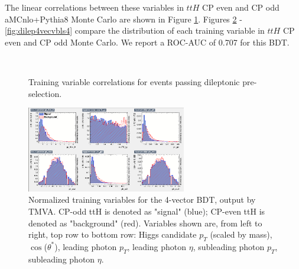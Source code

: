 The linear correlations between these variables in $ttH$ CP even and CP odd aMCnlo+Pythia8 Monte Carlo are shown in Figure \ref{fig:dilepcorr4vec}.  Figures \ref{fig:dilep4vecvbls1} - \ref{fig:dilep4vecvbls4} compare the distribution of each training variable in $ttH$ CP even and CP odd Monte Carlo. We report a ROC-AUC of 0.707 for this BDT.

\begin{figure}[htbp]
  \centering
    \\
 \caption{Training variable correlations for events passing dileptonic pre-selection.}
  \label{fig:dilepcorr4vec}
\end{figure}
\begin{figure}[htbp]
  \centering
  	\includegraphics[width=0.62\textwidth]{figures/TMVABDTStudies/dilep-vbls4vec/dilep4vecvbls1.png}
  \caption{Normalized training variables for the 4-vector BDT, output by TMVA. CP-odd ttH is denoted as "signal" (blue); CP-even ttH is denoted as "background" (red). Variables shown are, from left to right, top row to bottom row: Higgs candidate $p_{T}$ (scaled by mass), $\cos$($\theta^{*}$), leading photon $p_{T}$, leading photon $\eta$, subleading photon $p_{T}$, subleading photon $\eta$.}
  \label{fig:dilep4vecvbls1}
\end{figure}

